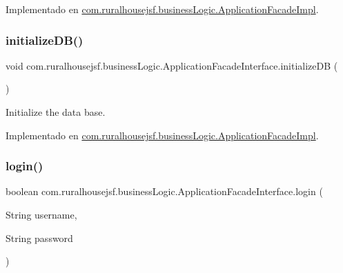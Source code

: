Implementado en \mbox{\hyperlink{classcom_1_1ruralhousejsf_1_1business_logic_1_1_application_facade_impl_a178d3964ff871edce1f5a207331319ed}{com.\+ruralhousejsf.\+business\+Logic.\+Application\+Facade\+Impl}}.

\mbox{\label{interfacecom_1_1ruralhousejsf_1_1business_logic_1_1_application_facade_interface_a4670319006cee17060e0c84695d7195f}} 
\subsubsection{\texorpdfstring{initializeDB()}{initializeDB()}}
{\footnotesize\ttfamily void com.\+ruralhousejsf.\+business\+Logic.\+Application\+Facade\+Interface.\+initialize\+DB (\begin{DoxyParamCaption}{ }\end{DoxyParamCaption})}

Initialize the data base. 

Implementado en \mbox{\hyperlink{classcom_1_1ruralhousejsf_1_1business_logic_1_1_application_facade_impl_a1e6cbb70c9568899c86135b3264b431d}{com.\+ruralhousejsf.\+business\+Logic.\+Application\+Facade\+Impl}}.

\mbox{\label{interfacecom_1_1ruralhousejsf_1_1business_logic_1_1_application_facade_interface_a75cc2d20f7df7b8872333cca281bf343}} 
\subsubsection{\texorpdfstring{login()}{login()}}
{\footnotesize\ttfamily boolean com.\+ruralhousejsf.\+business\+Logic.\+Application\+Facade\+Interface.\+login (\begin{DoxyParamCaption}\item[{String}]{username,  }\item[{String}]{password }\end{DoxyParamCaption})}

